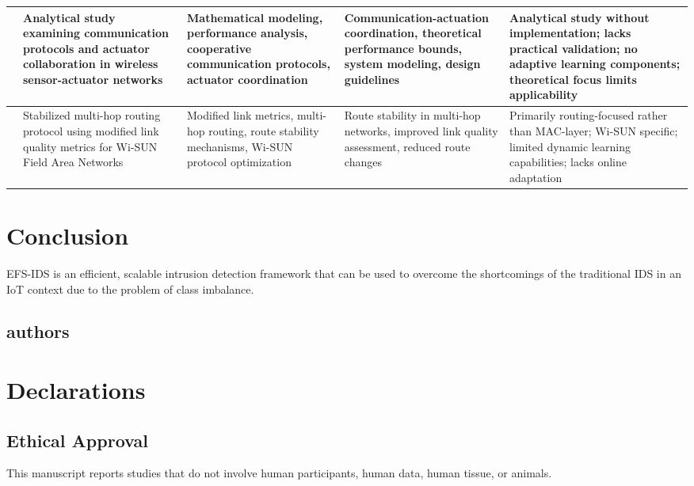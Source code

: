 \documentclass[a4paper,fleqn]{cas-dc}
\numberwithin{equation}{section}
\begin{document}
\begin{table}[htbp]
\begin{tabular}{|L{0.8cm}|L{3.2cm}|L{2.8cm}|L{3cm}|L{3.5cm}|}
{\cite{Alward2025}} & Analytical study examining communication protocols and actuator collaboration in wireless sensor-actuator networks & Mathematical modeling, performance analysis, cooperative communication protocols, actuator coordination & Communication-actuation coordination, theoretical performance bounds, system modeling, design guidelines & Analytical study without implementation; lacks practical validation; no adaptive learning components; theoretical focus limits applicability \\
\hline

{\cite{Nagao2025607}} & Stabilized multi-hop routing protocol using modified link quality metrics for Wi-SUN Field Area Networks & Modified link metrics, multi-hop routing, route stability mechanisms, Wi-SUN protocol optimization & Route stability in multi-hop networks, improved link quality assessment, reduced route changes & Primarily routing-focused rather than MAC-layer; Wi-SUN specific; limited dynamic learning capabilities; lacks online adaptation \\
\hline

\end{tabular}
\end{table}


\section{Conclusion}

EFS-IDS is an efficient, scalable intrusion detection framework that can be used to overcome the shortcomings of the traditional IDS in an IoT context due to the problem of class imbalance.



\subsection{authors}





\section*{Declarations}
\subsection*{Ethical Approval}
This manuscript reports studies that do not involve human participants, human data, human tissue, or animals.
\end{document}
